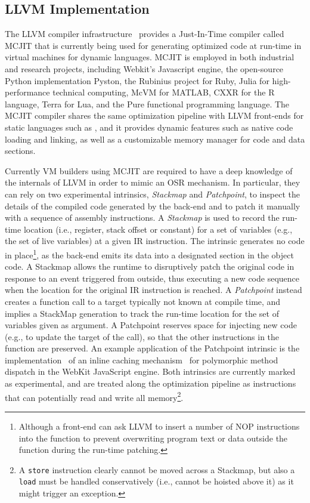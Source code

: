 \subsection{LLVM Implementation}
\label{ss:osrkit-implementation}

The LLVM compiler infrastructure~\cite{Lattner04} provides a Just-In-Time compiler called MCJIT that is currently being used for generating optimized code at run-time in virtual machines for dynamic languages. MCJIT is employed in both industrial and research projects, including Webkit's Javascript engine, the open-source Python implementation Pyston, the Rubinius project for Ruby, Julia for high-performance technical computing, McVM for MATLAB, CXXR for the R language, Terra for Lua, and the Pure functional programming language. The MCJIT compiler shares the same optimization pipeline with LLVM front-ends for static languages such as \clang, and it provides dynamic features such as native code loading and linking, as well as a customizable memory manager for code and data sections.

Currently VM builders using MCJIT are required to have a deep knowledge of the internals of LLVM in order to mimic an OSR mechanism. In particular, they can rely on two experimental intrinsics, {\em Stackmap} and {\em Patchpoint}, to inspect the details of the compiled code generated by the back-end and to patch it manually with a sequence of assembly instructions. A {\em Stackmap} is used to record the run-time location (i.e., register, stack offset or constant) for a set of variables (e.g., the set of live variables) at a given IR instruction. The intrinsic generates no code in place\footnote{Although a front-end can ask LLVM to insert a number of NOP instructions into the function to prevent overwriting program text or data outside the function during the run-time patching.}, as the back-end emits its data into a designated section in the object code. A Stackmap allows the runtime to disruptively patch the original code in response to an event triggered from outside, thus executing a new code sequence when the location for the original IR instruction is reached. A {\em Patchpoint} instead creates a function call to a target typically not known at compile time, and implies a StackMap generation to track the run-time location for the set of variables given as argument. A Patchpoint reserves space for injecting new code (e.g., to update the target of the call), so that the other instructions in the function are preserved. An example application of the Patchpoint intrinsic is the implementation~\cite{Pizlo14} of an inline caching mechanism~\cite{Deutsch84} for polymorphic method dispatch in the WebKit JavaScript engine. Both intrinsics are currently marked as experimental, and are treated along the optimization pipeline as instructions that can potentially read and write all memory\footnote{A {\tt store} instruction clearly cannot be moved across a Stackmap, but also a {\tt load} must be handled conservatively (i.e., cannot be hoisted above it) as it might trigger an exception.}.

